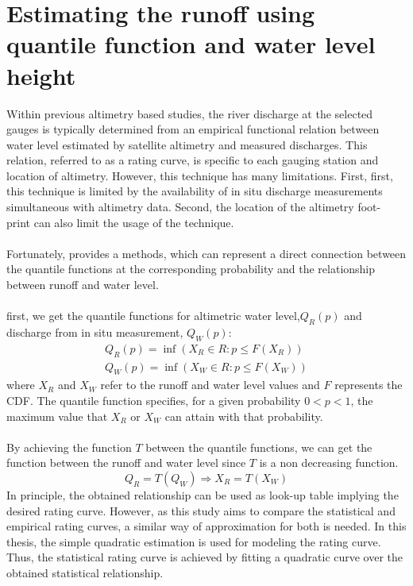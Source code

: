 \section{Estimating the runoff using quantile function and water level height}\label{sec:waterlevel}
Within previous altimetry based studies, the river discharge at the selected gauges is typically determined from an empirical functional relation between water level estimated by satellite altimetry and measured discharges. This relation, referred to as a rating curve, is specific to each gauging station and location of altimetry. However, this technique has many limitations. First, first, this technique is limited by the availability of in situ discharge measurements simultaneous with altimetry data. Second, the location of the altimetry foot- print can also limit the usage of the technique.\\\\
Fortunately, \cite{tourian2013quantile} provides a methods, which can represent a direct connection between the quantile functions at the corresponding probability and the relationship between runoff and water level. \\\\
first, we get the quantile functions for altimetric water level,$Q_R(p)$ and discharge from in situ measurement, $Q_W(p)$:
\begin{gather*}
	Q_R(p) = \inf(X_R \in R: p\leq F(X_R)) \\
	Q_W(p) = \inf(X_W \in R: p\leq F(X_W)) 
\end{gather*}
where $X_R$ and $X_W$ refer to the runoff and water level values and $F$ represents the CDF. The quantile function specifies, for a given probability $0 < p < 1$, the maximum value that $X_R$ or $X_W$ can attain with that probability.\\\\
By achieving the function $T$ between the quantile functions, we can get the function between the runoff and water level since $T$ is a non decreasing function. 
\begin{equation}
	Q_R = T(Q_W) \Longrightarrow X_R = T(X_W)
\end{equation}
In principle, the obtained relationship can be used as look-up table implying the desired rating curve. However, as this study aims to compare the statistical and empirical rating curves, a similar way of approximation for both is needed. In this thesis, the simple quadratic estimation is used for modeling the rating curve. Thus, the statistical rating curve
is achieved by fitting a quadratic curve over the obtained statistical relationship.